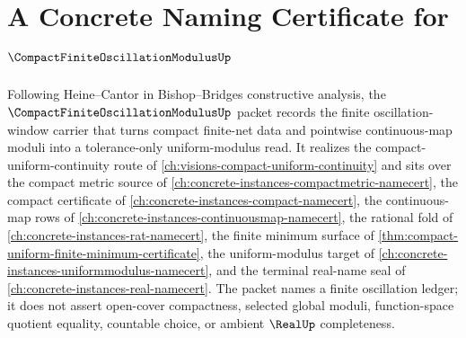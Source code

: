 \chapter{A Concrete Naming Certificate for $\CompactFiniteOscillationModulusUp$}
\label{ch:concrete-instances-compact-finite-oscillation-modulus-namecert}

Following Heine--Cantor in Bishop--Bridges constructive analysis, the $\CompactFiniteOscillationModulusUp$ packet records the finite oscillation-window carrier that turns compact finite-net data and pointwise continuous-map moduli into a tolerance-only uniform-modulus read. It realizes the compact-uniform-continuity route of \autoref{ch:visions-compact-uniform-continuity} and sits over the compact metric source of \autoref{ch:concrete-instances-compactmetric-namecert}, the compact certificate of \autoref{ch:concrete-instances-compact-namecert}, the continuous-map rows of \autoref{ch:concrete-instances-continuousmap-namecert}, the rational fold of \autoref{ch:concrete-instances-rat-namecert}, the finite minimum surface of \autoref{thm:compact-uniform-finite-minimum-certificate}, the uniform-modulus target of \autoref{ch:concrete-instances-uniformmodulus-namecert}, and the terminal real-name seal of \autoref{ch:concrete-instances-real-namecert}. The packet names a finite oscillation ledger; it does not assert open-cover compactness, selected global moduli, function-space quotient equality, countable choice, or ambient $\RealUp$ completeness.

